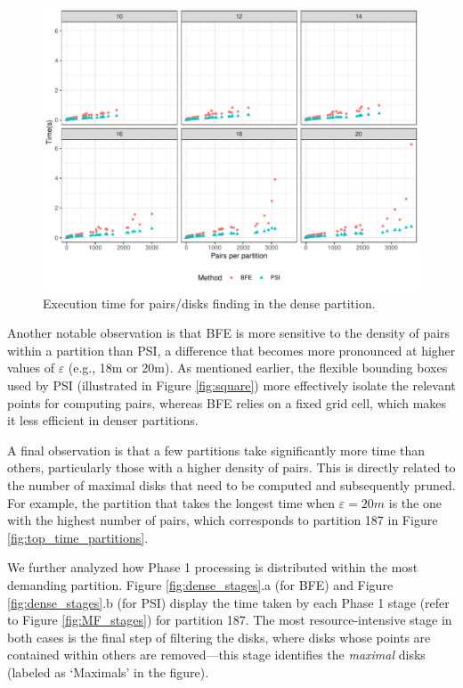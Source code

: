 \begin{figure}
    \centering
    \includegraphics[width=0.85\linewidth]{chapter4/figures/plots/04_pairs_performance/pairs_performance.pdf}
    \caption{Execution time for pairs/disks finding in the dense partition.}
    \label{fig:pairs_performance}
\end{figure}

Another notable observation is that BFE is more sensitive to the density of pairs within a partition than PSI, a difference that becomes more pronounced at higher values of $\varepsilon$ (e.g., 18m or 20m). As mentioned earlier, the flexible bounding boxes used by PSI (illustrated in Figure \ref{fig:square}) more effectively isolate the relevant points for computing pairs, whereas BFE relies on a fixed grid cell, which makes it less efficient in denser partitions.

A final observation is that a few partitions take significantly more time than others, particularly those with a higher density of pairs. This is directly related to the number of maximal disks that need to be computed and subsequently pruned. For example, the partition that takes the longest time when $\varepsilon = 20m$ is the one with the highest number of pairs, which corresponds to partition 187 in Figure \ref{fig:top_time_partitions}.

We further analyzed how Phase 1 processing is distributed within the most demanding partition. Figure \ref{fig:dense_stages}.a (for BFE) and Figure 
\ref{fig:dense_stages}.b (for PSI) display the time taken by each Phase 1 stage (refer to Figure \ref{fig:MF_stages}) for partition 187. The most 
resource-intensive stage in both cases is the final step of filtering the disks, where disks whose points are contained within others are removed—this stage 
identifies the \textit{maximal} disks (labeled as `Maximals' in the figure).

